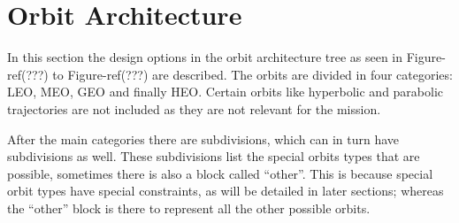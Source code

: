 \section{Orbit Architecture}
\label{blDOOrb}
In this section the design options in the orbit architecture tree as seen in Figure-ref(???) to Figure-ref(???) are described. The orbits are divided in four categories: \ac{LEO}, \ac{MEO}, \ac{GEO} and finally \ac{HEO}. Certain orbits like hyperbolic and parabolic trajectories are not included as they are not relevant for the mission.

After the main categories there are subdivisions, which can in turn have subdivisions as well. These subdivisions list the special orbits types that are possible, sometimes there is also a block called ``other''. This is because special orbit types have special constraints, as will be detailed in later sections; whereas the ``other'' block is there to represent all the other possible orbits.


